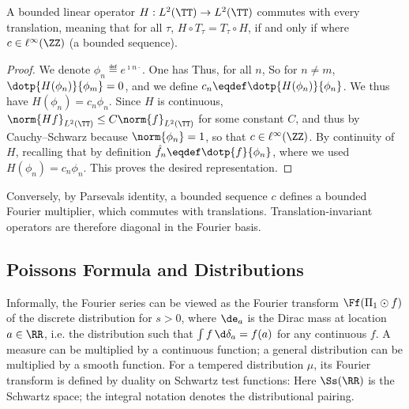 \begin{prop}\label{prop-ti-convol-l2}
	A bounded linear operator $H : L^2(\TT) \rightarrow L^2(\TT)$ commutes with every translation, meaning that for all $\tau$, $H \circ T_\tau = T_\tau \circ H$, if and only if
	where $c \in \ell^\infty(\ZZ)$ (a bounded sequence).
\end{prop}
\begin{proof}
	We denote $\phi_n \eqdef e^{\imath n \cdot}$. 
	One has
	Thus, for all $n$, 
	So for $n \neq m$, $\dotp{H(\phi_n)}{\phi_m} = 0$, and we define $c_n \eqdef \dotp{H(\phi_n)}{\phi_n}$.
	We thus have $H(\phi_n) = c_n \phi_n$.
	Since $H$ is continuous, $\norm{Hf}_{L^2(\TT)} \leq C \norm{f}_{L^2(\TT)}$ for some constant $C$, and thus
	by Cauchy--Schwarz
	because $\norm{\phi_n}=1$, so that $c \in \ell^\infty(\ZZ)$.
	By continuity of $H$, recalling that by definition $\hat f_n \eqdef \dotp{f}{\phi_n}$, 
	where we used $H(\phi_n) = c_n \phi_n$. This proves the desired representation.
\end{proof}

Conversely, by Parseval\textquotesingle s identity, a bounded sequence $c$ defines a bounded Fourier multiplier, which commutes with translations. Translation-invariant operators are therefore diagonal in the Fourier basis.

\subsection{Poisson\textquotesingle s Formula and Distributions}

Informally, the Fourier series
can be viewed as the Fourier transform $\Ff( \Pi_1 \odot f )$ of the discrete distribution
for $s>0$,
where $\de_a$ is the Dirac mass at location $a \in \RR$, i.e. the distribution such that $\int f\,\d\delta_a=f(a)$ for any continuous $f$. A measure can be multiplied by a continuous function; a general distribution can be multiplied by a smooth function. For a tempered distribution $\mu$, its Fourier transform is defined by duality on Schwartz test functions:
Here $\Ss(\RR)$ is the Schwartz space; the integral notation denotes the distributional pairing.

